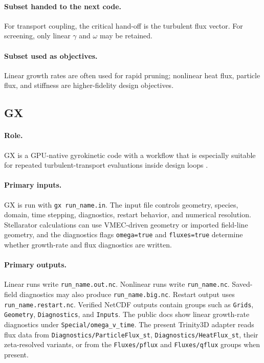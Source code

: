 \documentclass[11pt]{article}
\newcommand{\code}[1]{\texttt{#1}}
\begin{document}
\paragraph{Subset handed to the next code.}
For transport coupling, the critical hand-off is the turbulent flux vector. For
screening, only linear \(\gamma\) and \(\omega\) may be retained.

\paragraph{Subset used as objectives.}
Linear growth rates are often used for rapid pruning; nonlinear heat flux,
particle flux, and stiffness are higher-fidelity design objectives.

\subsection{GX}

\paragraph{Role.}
GX is a GPU-native gyrokinetic code with a workflow that is especially suitable
for repeated turbulent-transport evaluations inside design loops
\citep{Mandell2018,Mandell2024GX,GXRepo}.

\paragraph{Primary inputs.}
GX is run with \code{gx run\_name.in}. The input file controls geometry,
species, domain, time stepping, diagnostics, restart behavior, and numerical
resolution. Stellarator calculations can use VMEC-driven geometry or imported
field-line geometry, and the diagnostics flags \code{omega=true} and
\code{fluxes=true} determine whether growth-rate and flux diagnostics are
written.

\paragraph{Primary outputs.}
Linear runs write \code{run\_name.out.nc}. Nonlinear runs write
\code{run\_name.nc}. Saved-field diagnostics may also produce
\code{run\_name.big.nc}. Restart output uses \code{run\_name.restart.nc}.
Verified NetCDF outputs contain groups such as \code{Grids},
\code{Geometry}, \code{Diagnostics}, and \code{Inputs}. The
public docs show linear growth-rate diagnostics under
\code{Special/omega\_v\_time}. The present Trinity3D adapter reads flux data
from \code{Diagnostics/ParticleFlux\_st},
\code{Diagnostics/HeatFlux\_st}, their zeta-resolved variants, or from the
\code{Fluxes/pflux} and \code{Fluxes/qflux} groups when present.
\end{document}
